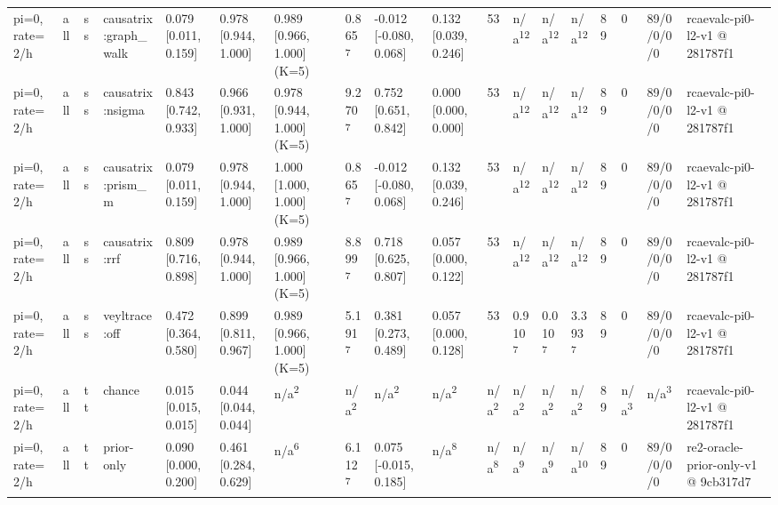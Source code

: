 \begin{table}[t]
\begin{tabular}{llllllllllllllllll}
pi=0, rate=2/h & all & ss & causatrix:graph\_walk & 0.079 [0.011, 0.159] & 0.978 [0.944, 1.000] & 0.989 [0.966, 1.000] (K=5) & 0.865\textsuperscript{7} & -0.012 [-0.080, 0.068] & 0.132 [0.039, 0.246] & 53 & n/a\textsuperscript{12} & n/a\textsuperscript{12} & n/a\textsuperscript{12} & 89 & 0 & 89/0/0/0/0 & rcaevalc-pi0-l2-v1 @ 281787f1 \\
pi=0, rate=2/h & all & ss & causatrix:nsigma & 0.843 [0.742, 0.933] & 0.966 [0.931, 1.000] & 0.978 [0.944, 1.000] (K=5) & 9.270\textsuperscript{7} & 0.752 [0.651, 0.842] & 0.000 [0.000, 0.000] & 53 & n/a\textsuperscript{12} & n/a\textsuperscript{12} & n/a\textsuperscript{12} & 89 & 0 & 89/0/0/0/0 & rcaevalc-pi0-l2-v1 @ 281787f1 \\
pi=0, rate=2/h & all & ss & causatrix:prism\_m & 0.079 [0.011, 0.159] & 0.978 [0.944, 1.000] & 1.000 [1.000, 1.000] (K=5) & 0.865\textsuperscript{7} & -0.012 [-0.080, 0.068] & 0.132 [0.039, 0.246] & 53 & n/a\textsuperscript{12} & n/a\textsuperscript{12} & n/a\textsuperscript{12} & 89 & 0 & 89/0/0/0/0 & rcaevalc-pi0-l2-v1 @ 281787f1 \\
pi=0, rate=2/h & all & ss & causatrix:rrf & 0.809 [0.716, 0.898] & 0.978 [0.944, 1.000] & 0.989 [0.966, 1.000] (K=5) & 8.899\textsuperscript{7} & 0.718 [0.625, 0.807] & 0.057 [0.000, 0.122] & 53 & n/a\textsuperscript{12} & n/a\textsuperscript{12} & n/a\textsuperscript{12} & 89 & 0 & 89/0/0/0/0 & rcaevalc-pi0-l2-v1 @ 281787f1 \\
pi=0, rate=2/h & all & ss & veyltrace:off & 0.472 [0.364, 0.580] & 0.899 [0.811, 0.967] & 0.989 [0.966, 1.000] (K=5) & 5.191\textsuperscript{7} & 0.381 [0.273, 0.489] & 0.057 [0.000, 0.128] & 53 & 0.910\textsuperscript{7} & 0.010\textsuperscript{7} & 3.393\textsuperscript{7} & 89 & 0 & 89/0/0/0/0 & rcaevalc-pi0-l2-v1 @ 281787f1 \\
pi=0, rate=2/h & all & tt & chance & 0.015 [0.015, 0.015] & 0.044 [0.044, 0.044] & n/a\textsuperscript{2} & n/a\textsuperscript{2} & n/a\textsuperscript{2} & n/a\textsuperscript{2} & n/a\textsuperscript{2} & n/a\textsuperscript{2} & n/a\textsuperscript{2} & n/a\textsuperscript{2} & 89 & n/a\textsuperscript{3} & n/a\textsuperscript{3} & rcaevalc-pi0-l2-v1 @ 281787f1 \\
pi=0, rate=2/h & all & tt & prior-only & 0.090 [0.000, 0.200] & 0.461 [0.284, 0.629] & n/a\textsuperscript{6} & 6.112\textsuperscript{7} & 0.075 [-0.015, 0.185] & n/a\textsuperscript{8} & n/a\textsuperscript{8} & n/a\textsuperscript{9} & n/a\textsuperscript{9} & n/a\textsuperscript{10} & 89 & 0 & 89/0/0/0/0 & re2-oracle-prior-only-v1 @ 9cb317d7 \\

\end{tabular}
\end{table}
